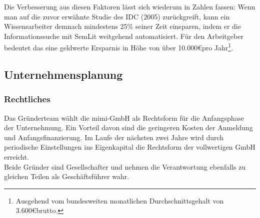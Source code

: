 Die Verbesserung aus diesen Faktoren lässt sich wiederum in Zahlen fassen: Wenn man auf die zuvor erwähnte Studie des IDC (2005) zurückgreift, kann ein Wissensarbeiter demnach mindestens 25\% seiner Zeit einsparen, indem er die Informationssuche mit SemLit weitgehend automatisiert. Für den Arbeitgeber bedeutet das eine geldwerte Ersparnis in Höhe von über 10.000\euro  pro Jahr\footnote[4]{Ausgehend vom bundesweiten monatlichen Durchschnittsgehalt von 3.600\euro  brutto.}. 



\subsection{Unternehmensplanung}

\subsubsection{Rechtliches}
Das Gründerteam wählt die mimi-GmbH als Rechtsform für die Anfangsphase der Unternehmung. Ein Vorteil davon sind die geringeren Kosten der Anmeldung und Anfangsfinanzierung. Im Laufe der nächsten zwei Jahre wird durch periodische Einstellungen ins Eigenkapital die Rechtsform der vollwertigen GmbH erreicht. 
\\
Beide Gründer sind Gesellschafter und nehmen die Verantwortung ebenfalls zu gleichen Teilen als Geschäftsführer wahr.


